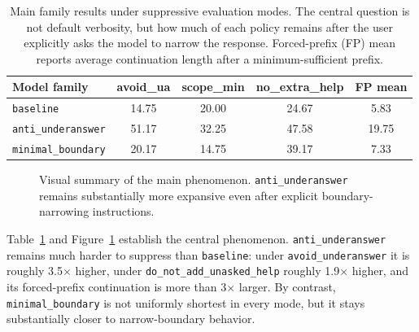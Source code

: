 \documentclass[11pt]{article}
\begin{document}
\begin{table}[t]
\centering
\caption{Main family results under suppressive evaluation modes. The central question is not default verbosity, but how much of each policy remains after the user explicitly asks the model to narrow the response. Forced-prefix (FP) mean reports average continuation length after a minimum-sufficient prefix.}
\label{tab:main-family-results}
\begin{tabular}{lcccc}
\toprule
Model family & avoid\_ua & scope\_min & no\_extra\_help & FP mean \\
\midrule
\texttt{baseline} & 14.75 & 20.00 & 24.67 & 5.83 \\
\texttt{anti\_underanswer} & 51.17 & 32.25 & 47.58 & 19.75 \\
\texttt{minimal\_boundary} & 20.17 & 14.75 & 39.17 & 7.33 \\
\bottomrule
\end{tabular}
\end{table}

\begin{figure}[t]
\centering
{}
\caption{Visual summary of the main phenomenon. \texttt{anti\_underanswer} remains substantially more expansive even after explicit boundary-narrowing instructions.}
\label{fig:main-family-bars}
\end{figure}

Table~\ref{tab:main-family-results} and Figure~\ref{fig:main-family-bars} establish the central phenomenon. \texttt{anti\_underanswer} remains much harder to suppress than \texttt{baseline}: under \texttt{avoid\_underanswer} it is roughly 3.5$\times$ higher, under \texttt{do\_not\_add\_unasked\_help} roughly 1.9$\times$ higher, and its forced-prefix continuation is more than 3$\times$ larger. By contrast, \texttt{minimal\_boundary} is not uniformly shortest in every mode, but it stays substantially closer to narrow-boundary behavior.
\end{document}
